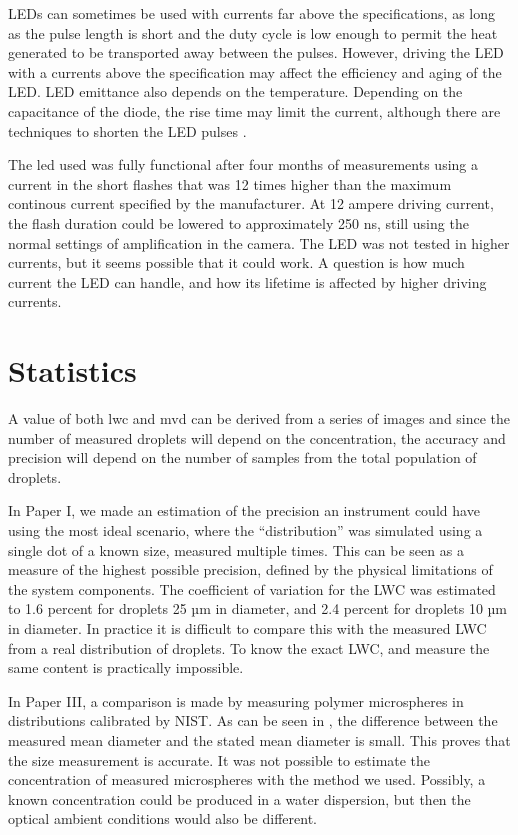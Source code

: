LEDs can sometimes be used with currents far above the specifications, as long as the pulse length is short and the duty cycle is low enough to permit the heat generated to be transported away between the pulses. However, driving the LED with a currents above the specification may affect the efficiency and aging of the LED. LED emittance also depends on the temperature. Depending on the capacitance of the diode, the rise time may limit the current, although there are techniques to shorten the LED pulses \cite{tanaka2011,vele2007}.

The \gls{led} used was fully functional after four months of measurements using a current in the short flashes that was 12 times higher than the maximum continous current specified by the manufacturer. At 12 ampere driving current, the flash duration could be lowered to approximately 250 ns, still using the normal settings of amplification in the camera. The LED was not tested in higher currents, but it seems possible that it could work. A question is how much current the LED can handle, and how its lifetime is affected by higher driving currents.

\section{Statistics}

A value of both \gls{lwc} and \gls{mvd} can be derived from a series of images and since the number of measured droplets will depend on the concentration, the accuracy and precision will depend on the number of samples from the total population of droplets. 

In Paper I, we made an estimation of the precision an instrument could have using the most ideal scenario, where the ``distribution'' was simulated using a single dot of a known size, measured multiple times. This can be seen as a measure of the highest possible precision, defined by the physical limitations of the system components. The coefficient of variation for the LWC was estimated to 1.6 percent for droplets 25 µm in diameter, and 2.4 percent for droplets 10 µm in diameter. In practice it is difficult to compare this with the measured LWC from a real  distribution of droplets. To know the exact LWC, and measure the same content is practically impossible. 

In Paper III, a comparison is made by measuring polymer microspheres in distributions calibrated by NIST. As can be seen in , the difference between the measured mean diameter and the stated mean diameter is small. This proves that the size measurement is accurate. It was not possible to estimate the concentration of measured microspheres with the method we used. Possibly, a known concentration could be produced in a water dispersion, but then the optical ambient conditions would also be different.


